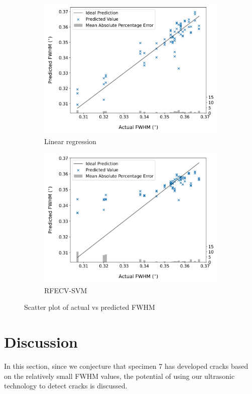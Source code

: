 \begin{figure}[tb]
  \centering
  \begin{subfigure}[t]{\linewidth}
    \centering
    \includegraphics[width=0.8\linewidth]{fig/fwhm_predict_vs_true_lr.png}
    \caption{Linear regression}
    \label{fig: fwhm prediction lr}
  \end{subfigure}
  \begin{subfigure}[t]{\linewidth}
    \centering
    \includegraphics[width=0.8\linewidth]{fig/fwhm_predict_vs_true_svm.png}
    \caption{RFECV-SVM}
    \label{fig: fwhm prediction svm}
  \end{subfigure}

  \caption{Scatter plot of actual vs predicted FWHM}
  \label{fig: fwhm prediction}
\end{figure}

\section{Discussion}
\label{sec: reg discussion}
In this section, since we conjecture that specimen 7 has developed cracks based on the relatively small FWHM values, the potential of using our ultrasonic technology to detect cracks is discussed.

